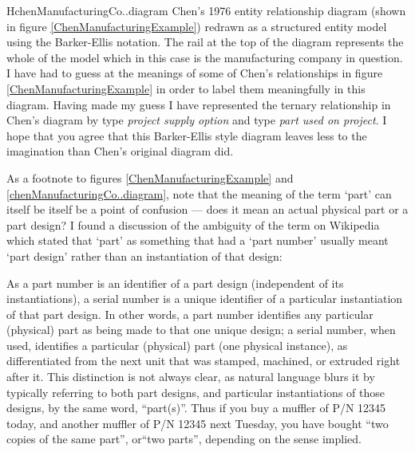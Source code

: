 \begin{erboxedFigure} {H}{chenManufacturingCo..diagram}{
Chen's 1976 entity relationship diagram (shown in figure \ref{ChenManufacturingExample}) 
redrawn as a structured entity model using the Barker-Ellis notation. 
 The rail at the top of the diagram represents the whole of the model which in this case is the manufacturing company in question.
I have had to guess at the meanings of some of Chen's relationships in figure \ref{ChenManufacturingExample}
 in order to label them meaningfully in this diagram. 
Having made my guess I have represented  the ternary relationship in Chen's diagram by type \textit{project supply option} and type \textit{part used on project}. 
I hope that you agree that this Barker-Ellis style diagram leaves less to the imagination than Chen's original diagram did.
}
\scalebox{0.95}{}
\end{erboxedFigure}
As a footnote to figures \ref{ChenManufacturingExample} and \ref{chenManufacturingCo..diagram}, 
note that the  meaning of the term  `part' can itself be itself be a point of confusion ---
does it mean an actual physical part or  a part design?
I found a discussion of the ambiguity of the term  on Wikipedia which stated that `part' as something that had a `part number' usually meant `part design' rather than an instantiation of that design:
\begin{erquote}
As a part number is an identifier of a part design (independent of its instantiations), a serial number is a unique identifier of a particular instantiation of that part design. In other words, a part number identifies any particular (physical) part as being made to that one unique design; a serial number, when used, identifies a particular (physical) part (one physical instance), as differentiated from the next unit that was stamped, machined, or extruded right after it. This distinction is not always clear, as natural language blurs it by typically referring to both part designs, and particular instantiations of those designs, by the same word, ``part(s)''. Thus if you buy a muffler of P/N 12345 today, and another muffler of P/N 12345 next Tuesday, you have bought ``two copies of the same part'', or``two parts'', depending on the sense implied.
\end{erquote}

